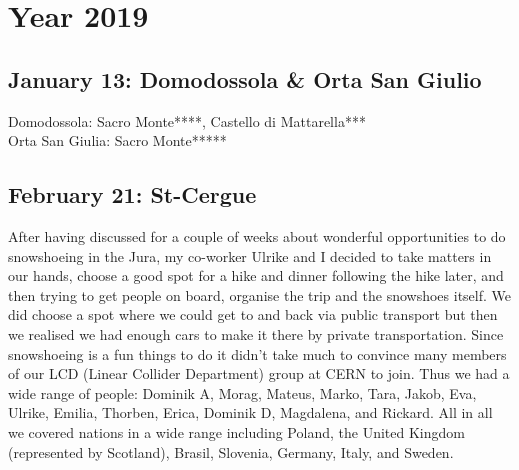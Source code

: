 \chapter{Year 2019}
\label{2019}

\section{January 13: Domodossola \& Orta San Giulio}
\label{2019:Domodossola}

Domodossola: Sacro Monte****, Castello di Mattarella***\\
Orta San Giulia: Sacro Monte*****

\section{February 21: St-Cergue}
\label{StCergue2019}

After having discussed for a couple of weeks about wonderful opportunities to do snowshoeing in the Jura, my co-worker Ulrike and I decided to take matters in our hands, choose a good spot for a hike and dinner following the hike later, and then trying to get people on board, organise the trip and the snowshoes itself. We did choose a spot where we could get to and back via public transport but then we realised we had enough cars to make it there by private transportation. Since snowshoeing is a fun things to do it didn't take much to convince many members of our LCD (Linear Collider Department) group at CERN to join. Thus we had a wide range of people: Dominik A, Morag, Mateus, Marko, Tara, Jakob, Eva, Ulrike, Emilia, Thorben, Erica, Dominik D, Magdalena, and Rickard. All in all we covered nations in a wide range including Poland, the United Kingdom (represented by Scotland), Brasil, Slovenia, Germany, Italy, and Sweden. \\

